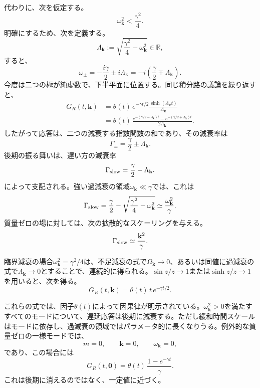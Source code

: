 \documentclass[a4paper,11pt,oneside]{article}
\theoremstyle{definition}
\numberwithin{equation}{section}
\begin{document}
代わりに、次を仮定する。
\begin{equation}
\omega_{\mathbf k}^2<\frac{\gamma^2}{4}.
\end{equation}
明確にするため、次を定義する。
\begin{equation}
\Lambda_{\mathbf k}
:=
\sqrt{
\frac{\gamma^2}{4}-\omega_{\mathbf k}^2
} \in \mathbb{R},
\end{equation}
すると、
\begin{equation}
\omega_\pm
=
-\frac{i\gamma}{2}
\pm
i\Lambda_{\mathbf k}
=
-i\left(
\frac{\gamma}{2}
\mp
\Lambda_{\mathbf k}
\right).
\end{equation}
今度は二つの極が純虚数で、下半平面に位置する。同じ積分路の議論を繰り返すと、
\begin{align}
G_R(t,\mathbf k)
&=
\theta(t)\,
e^{-\gamma t/2}
\frac{\sinh(\Lambda_{\mathbf k}t)}{\Lambda_{\mathbf k}}
\nonumber\\
&=
\theta(t)\,
\frac{
e^{-(\gamma/2-\Lambda_{\mathbf k})t}
-
e^{-(\gamma/2+\Lambda_{\mathbf k})t}
}{
2\Lambda_{\mathbf k}
}.
\end{align}
したがって応答は、二つの減衰する指数関数の和であり、その減衰率は
\begin{equation}
\Gamma_\pm
=
\frac{\gamma}{2}
\pm
\Lambda_{\mathbf k}.
\end{equation}
後期の振る舞いは、遅い方の減衰率
\begin{equation}
\Gamma_{\rm slow}
=
\frac{\gamma}{2}
-
\Lambda_{\mathbf k}.
\end{equation}
によって支配される。強い過減衰の領域$\omega_{\mathbf k}\ll\gamma$では、これは
\begin{equation}
\Gamma_{\rm slow}
=
\frac{\gamma}{2}
-
\sqrt{
\frac{\gamma^2}{4}-\omega_{\mathbf k}^2
}
\simeq
\frac{\omega_{\mathbf k}^2}{\gamma}.
\end{equation}
質量ゼロの場に対しては、次の拡散的なスケーリングを与える。
\begin{equation}
\Gamma_{\rm slow}
\simeq
\frac{\mathbf k^2}{\gamma}.
\end{equation}


臨界減衰の場合$\omega_{\mathbf k}^2=\gamma^2/4$は、不足減衰の式で$\Omega_{\mathbf k}\to0$、あるいは同値に過減衰の式で$\Lambda_{\mathbf k}\to0$とすることで、連続的に得られる。$\sin z/z\to1$または$\sinh z/z\to1$を用いると、次を得る。
\begin{equation}
G_R(t,\mathbf k)
=
\theta(t)\,t\,e^{-\gamma t/2}.
\end{equation}


これらの式では、因子$\theta(t)$によって因果律が明示されている。$\omega_{\mathbf k}^2>0$を満たすすべてのモードについて、遅延応答は後期に減衰する。ただし緩和時間スケールはモードに依存し、過減衰の領域ではパラメータ的に長くなりうる。例外的な質量ゼロの一様モードでは、
\begin{equation}
m=0,
\qquad
\mathbf k=0,
\qquad
\omega_{\mathbf k}=0,
\end{equation}
であり、この場合には
\begin{equation}
G_R(t,\mathbf 0)
=
\theta(t)\,
\frac{1-e^{-\gamma t}}{\gamma}.
\end{equation}
これは後期に消えるのではなく、一定値に近づく。





\end{document}
